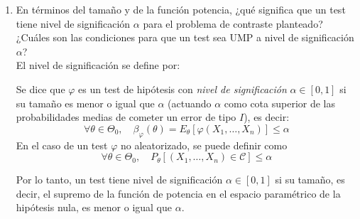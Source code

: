 \documentclass[12pt]{article}
\begin{document}
\begin{ejercicio}[2,4 puntos]
\begin{enumerate}
\begin{enumerate}
                \item[a3)] En términos del tamaño y de la función potencia, ¿qué significa que un test tiene
                nivel de significación $\alpha$ para el problema de contraste planteado? ¿Cuáles son las
                condiciones para que un test sea UMP a nivel de significación $\alpha$? \\

                El nivel de significación se define por:
                \begin{definicion}
                    Se dice que $\varphi$ es un test de hipótesis con \textit{nivel de significación} $\alpha \in [0,1]$
                    si su tamaño es menor o igual que $\alpha$ (actuando $\alpha$ como cota superior de las probabilidades
                    medias de cometer un error de tipo $I$), es decir:
                    $$\forall \theta \in \Theta_0, \quad \beta_\varphi(\theta) = E_\theta[\varphi(X_1, \ldots, X_n)]
                    \leqslant \alpha$$
                    En el caso de un test $\varphi$ no aleatorizado, se puede definir como
                    $$\forall \theta \in \Theta_0, \quad P_\theta[(X_1, \ldots, X_n) \in \mathcal{C}] \leqslant \alpha$$
                \end{definicion}

                Por lo tanto, un test tiene nivel de significación $\alpha \in [0,1]$ si su tamaño, es decir,
                el supremo de la función de potencia en el espacio paramétrico de la hipótesis nula, es menor o igual
                que $\alpha$. \\


\end{enumerate}
\end{enumerate}
\end{ejercicio}
\end{document}

